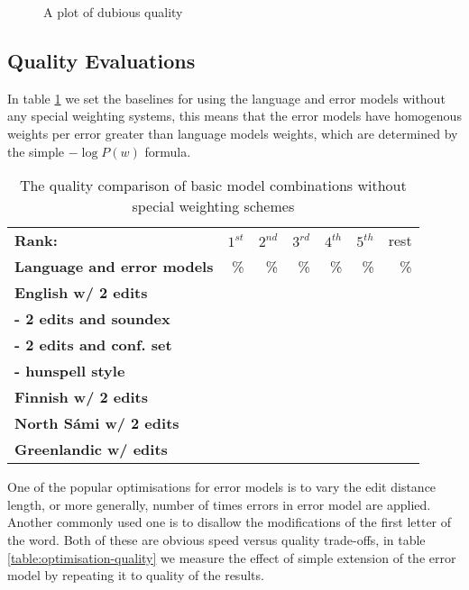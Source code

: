 \documentclass[a4paper,12pt]{article}
\begin{document}
\begin{figure}
    \centering
    \caption{A plot of dubious quality
    \label{fig:coverage}}
\end{figure}

\subsection{Quality Evaluations}


In table \ref{table:baseline-quality} 
we set the baselines for using the
language and error models without any special weighting systems, this means
that the error models have homogenous weights per error greater than language
models weights, which are determined by the simple $-\log P(w)$ formula.

\begin{table}
    \centering
    \begin{tabular}{|l|r|r|r|r|r|r|}
        \hline
        \bf Rank: & $1^{st}$ & $2^{nd}$ & $3^{rd}$ & $4^{th}$ & $5^{th}$ & rest \\
        \bf Language and error models &  \% & \% & \% & \% & \% & \% \\
        \hline
        \bf English w/ 2 edits & & & & & & \\
     \bf - 2 edits and soundex & & & & & & \\
   \bf - 2 edits and conf. set & & & & & & \\
          \bf - hunspell style & & & & & & \\
        \hline
        \bf Finnish w/ 2 edits & & & & & \\
        \hline
        \bf North Sámi w/ 2 edits & & & & & \\
        \hline
        \bf Greenlandic w/ edits & & & & & \\
        \hline
    \end{tabular}
    \caption{The quality comparison of basic model combinations without special
    weighting schemes\label{table:baseline-quality}}
\end{table}

One of the popular optimisations for error models is to vary the edit distance
length, or more generally, number of times errors in error model are applied.
Another commonly used one is to disallow the modifications of the first
letter of the word. Both of these are obvious speed versus quality
trade-offs, in table \ref{table:optimisation-quality} we measure the effect of
simple extension of the error model by repeating it to quality of the results.
\end{document}
